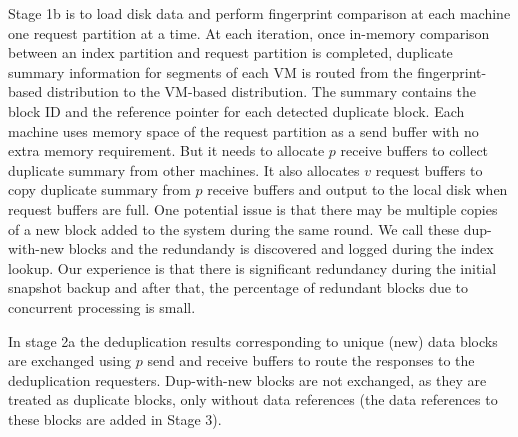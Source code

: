 Stage 1b is to load disk data and perform fingerprint comparison at each machine one request partition at a time.
At each iteration, once in-memory comparison between an index partition and request partition is completed,  
duplicate summary information for segments of each VM is routed from the fingerprint-based distribution  to the
VM-based distribution.  The summary contains the block ID and  the reference pointer for each detected duplicate block.   
Each machine uses memory space of the request partition as a send buffer with no extra memory requirement.
But it needs to allocate $p$ receive buffers to collect duplicate summary from other machines.
It also allocates $v$ request buffers to copy duplicate summary from $p$ receive buffers and output to the local disk
when request buffers are full. One potential issue is that there may be
multiple copies of a new block added to the system during the same round.
We call these dup-with-new blocks and the redundandy is discovered and
logged during the index lookup.
Our experience is that there is significant redundancy during the initial snapshot backup and after
that, the percentage of redundant blocks due to concurrent processing  is small.

In stage 2a the deduplication results corresponding to unique (new) data blocks
are exchanged using $p$ send and receive buffers to route the responses to the
deduplication requesters. Dup-with-new blocks are not exchanged, as they are
treated as duplicate blocks, only without data references (the data references
to these blocks are added in Stage 3).


